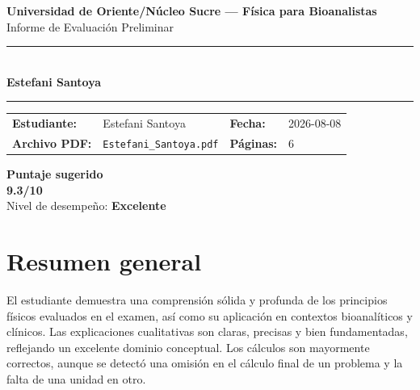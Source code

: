 \documentclass[11pt,a4paper]{article}
\begin{document}
\begin{center}
  {\Large\bfseries\color{azulTitulo} Universidad de Oriente/Núcleo Sucre --- Física para Bioanalistas}\\[4pt]
  {\large Informe de Evaluación Preliminar}\\[12pt]
  \rule{\linewidth}{1.2pt}\\[6pt]
  {\LARGE\bfseries Estefani Santoya}\\[4pt]
  \rule{\linewidth}{0.6pt}
\end{center}

\vspace{4pt}
\begin{tcolorbox}[cajaTitulo, title=Datos del informe]
\begin{tabular}{@{}llll@{}}
  \textbf{Estudiante:}  & Estefani Santoya  &
  \textbf{Fecha:}       & 2026-08-08 \\[4pt]
  \textbf{Archivo PDF:} & \texttt{Estefani\_Santoya.pdf}  &
  \textbf{Páginas:}     & 6 \\
\end{tabular}
\end{tcolorbox}

\vspace{6pt}
\begin{center}
  \begin{tcolorbox}[
    enhanced,
    colback=white, colframe=desempeno_excelente,
    width=0.62\linewidth,
    boxrule=2pt,
    halign=center, valign=center,
    top=8pt, bottom=8pt,
  ]
    \centering
    {\large\bfseries Puntaje sugerido}\\[6pt]
    {\Huge\bfseries\color{desempeno_excelente} 9.3/10}\\[6pt]
    {\large Nivel de desempeño: \textbf{\color{desempeno_excelente} Excelente}}
  \end{tcolorbox}
\end{center}

\section*{Resumen general}
El estudiante demuestra una comprensión sólida y profunda de los principios físicos evaluados en el examen, así como su aplicación en contextos bioanalíticos y clínicos. Las explicaciones cualitativas son claras, precisas y bien fundamentadas, reflejando un excelente dominio conceptual. Los cálculos son mayormente correctos, aunque se detectó una omisión en el cálculo final de un problema y la falta de una unidad en otro.
\end{document}
